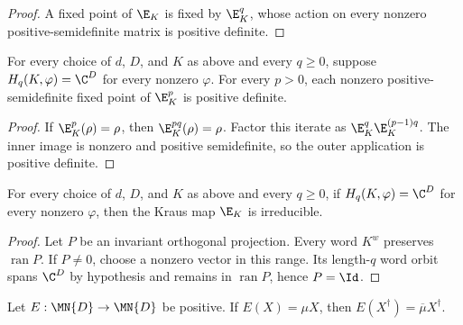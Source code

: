 \begin{proof}\leanok
    A fixed point of $\E_K$ is fixed by $\E_K^q$, whose action on every
    nonzero positive-semidefinite matrix is positive definite.
\end{proof}

\begin{theorem}
    \label{thm:kraus_power_fixed_point_posdef_from_spreading}
    \leanok
    For every choice of $d$, $D$, and $K$ as above and every $q\ge0$, suppose
    $H_q(K,\varphi)=\C^D$ for every nonzero $\varphi$. For every $p>0$, each
    nonzero
    positive-semidefinite fixed point of $\E_K^p$ is positive definite.
\end{theorem}

\begin{proof}\leanok
    If $\E_K^p(\rho)=\rho$, then $\E_K^{pq}(\rho)=\rho$. Factor this iterate
    as $\E_K^q\E_K^{(p-1)q}$. The inner image is nonzero and positive
    semidefinite, so the outer application is positive definite.
\end{proof}

\begin{theorem}
    \label{thm:kraus_irreducible_from_spreading}
    \leanok
    For every choice of $d$, $D$, and $K$ as above and every $q\ge0$, if
    $H_q(K,\varphi)=\C^D$ for every nonzero $\varphi$, then the Kraus map
    $\E_K$ is irreducible.
\end{theorem}

\begin{proof}\leanok
    Let $P$ be an invariant orthogonal projection. Every word $K^w$ preserves
    $\operatorname{ran}P$. If $P\neq0$, choose a nonzero vector in this range.
    Its length-$q$ word orbit spans $\C^D$ by hypothesis and remains in
    $\operatorname{ran}P$, hence $P=\Id$.
\end{proof}

\begin{theorem}
    \label{thm:positive-map-conj-eigenvector}
    \leanok
    Let $E:\MN{D}\to\MN{D}$ be positive. If $E(X)=\mu X$, then
    $E(X^\dagger)=\overline\mu X^\dagger$.
\end{theorem}

